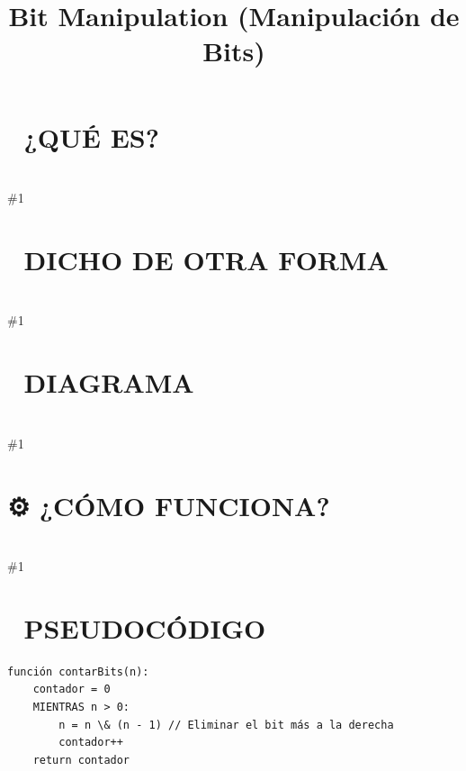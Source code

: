 \documentclass{article}
\newcommand{\quees}[1]{\section*{🤔 ¿QUÉ ES?}\hrulefill \\ \#1}
\newcommand{\dichodeotraforma}[1]{\section*{💬 DICHO DE OTRA FORMA}\hrulefill \\ \#1}
\newcommand{\diagrama}[1]{\section*{🎨 DIAGRAMA}\hrulefill \\ \#1}
\newcommand{\comofunciona}[1]{\section*{⚙️ ¿CÓMO FUNCIONA?}\hrulefill \\ \#1}
\begin{document}
\title{Bit Manipulation (Manipulación de Bits)}
\date{}
\maketitle
\quees{Los interruptores de luz 💡 de tu casa. 

Cada bit es como un interruptor: 1 significa "encendido" y 0 significa
"apagado". Manipular bits es jugar con esos interruptores usando 
reglas lógicas:
- AND: Solo enciende si AMBOS están encendidos.
- OR: Enciende si AL MENOS UNO está encendido.
- XOR: Solo enciende si EXACTAMENTE UNO está encendido.

Es la forma más profunda y rápida de hablarle a la computadora,
directamente en su lenguaje natural de ceros y unos.}
\dichodeotraforma{Bit Manipulation consiste en aplicar operaciones lógicas (AND, OR, 
XOR, NOT) y de desplazamiento (Shifts) sobre los bits individuales de 
un número entero.

A nivel de hardware, estas operaciones son las más rápidas que un 
procesador puede realizar. Usar bits permite ahorrar muchísima 
memoria y acelerar algoritmos que de otra forma usarían estructuras
más pesadas.}
\diagrama{\begin{verbatim}
Sean A = 5 (101) y B = 3 (011)

AND (\&):  101 \& 011 = 001 (1)
OR  (|):  101 | 011 = 111 (7)
XOR (^):  101 ^ 011 = 110 (6)  <-- ¡Nota: 1^1 = 0!

Left Shift (<<): 5 << 1 = 1010 (10)  (Multiplicar por 2)
Right Shift (>>): 5 >> 1 = 10 (2)    (Dividir entre 2)
\end{verbatim}}
\comofunciona{1. x \textasciicircum{} x = 0: Cualquier número XOR consigo mismo da cero. 
   (Base del problema "Single Number").
2. x \textasciicircum{} 0 = x: Cualquier número XOR cero se queda igual.
3. n \& (n - 1): ¡Truco de Google! Elimina el bit encendido más a la 
   derecha. Si el resultado es 0, entonces `n` era una potencia de 2.
4. i \& 1: Si da 0 es par, si da 1 es impar. (Más rápido que `i \% 2`).
5. n >> 1: Divide entre 2 (truncando).
6. 1 << n: Calcula 2 elevado a la potencia `n`.}
\section*{📝 PSEUDOCÓDIGO}
\hrulefill
\begin{verbatim}
función contarBits(n):
    contador = 0
    MIENTRAS n > 0:
        n = n \& (n - 1) // Eliminar el bit más a la derecha
        contador++
    return contador
\end{verbatim}
\end{document}

